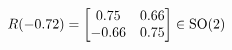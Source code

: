 \documentclass[preview]{standalone}
\begin{document}
\begin{align*}
\special{dvisvgm:raw <g id='unique000'>}R(-0.72) = \begin{bmatrix} 0.75 & 0.66 \\ -0.66 & 0.75 \end{bmatrix} \in \text{SO}(2)\special{dvisvgm:raw </g>}
\end{align*}
\end{document}
